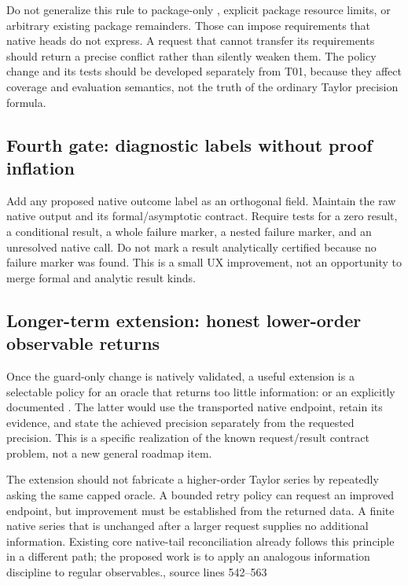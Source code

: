 \documentclass[11pt,letterpaper]{article}
\newcommand{\src}[2]{\cite{#1}, source lines #2}
\theoremstyle{definition}\newtheorem{definition}[proposition]{Definition}
\begin{document}
Do not generalize this rule to package-only ,
explicit package resource limits, or arbitrary existing package remainders.
Those can impose requirements that native heads do not express. A request that
cannot transfer its requirements should return a precise conflict rather than
silently weaken them. The policy change and its tests should be developed
separately from T01, because they affect coverage and evaluation semantics,
not the truth of the ordinary Taylor precision formula.

\subsection{Fourth gate: diagnostic labels without proof inflation}
Add any proposed native outcome label as an orthogonal field. Maintain the raw
native output and its formal/asymptotic contract. Require tests for a zero
result, a conditional result, a whole failure marker, a nested failure marker,
and an unresolved native call. Do not mark a result analytically certified
because no failure marker was found. This is a small UX improvement, not an
opportunity to merge formal and analytic result kinds.

\subsection{Longer-term extension: honest lower-order observable returns}
Once the guard-only change is natively validated, a useful extension is a
selectable policy for an oracle that returns too little information:
 or an explicitly documented
. The latter would use the transported native endpoint,
retain its evidence, and state the achieved precision separately from the
requested precision. This is a specific realization of the known request/result
contract problem, not a new general roadmap item.

The extension should not fabricate a higher-order Taylor series by repeatedly
asking the same capped oracle. A bounded retry policy can request an improved
endpoint, but improvement must be established from the returned data. A finite
native series that is unchanged after a larger request supplies no additional
information. Existing core native-tail reconciliation already follows this
principle in a different path; the proposed work is to apply an analogous
information discipline to regular observables.\src{core}{542--563}
\end{document}
